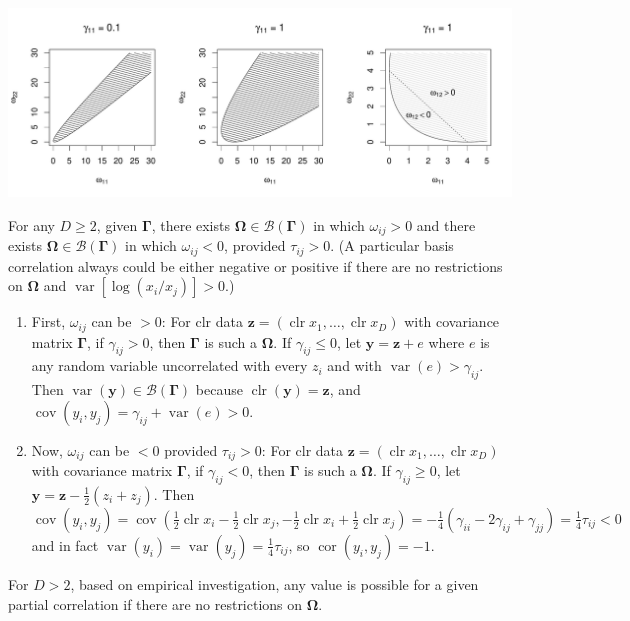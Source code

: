 \documentclass[12pt, letterpaper]{article}
\DeclareMathOperator{\cov}{\text{cov}}
\DeclareMathOperator{\cor}{\text{cor}}
\DeclareMathOperator{\var}{\text{var}}
\DeclareMathOperator{\clr}{\text{clr}}
\begin{document}
\includegraphics[width=5.5in]{figures/D2regions.pdf}

For any $D \geq 2$, given $\bm{\Gamma}$, there exists $\bm{\Omega} \in \mathscr{B}(\bm{\Gamma})$ in which $\omega_{ij} > 0$ and there exists $\bm{\Omega} \in \mathscr{B}(\bm{\Gamma})$ in which $\omega_{ij} < 0$, provided $\tau_{ij} > 0$. (A particular basis correlation always could be either negative or positive if there are no restrictions on $\bm{\Omega}$ and $\var[\log(x_i / x_j)] > 0$.)
\begin{enumerate}
\item First, $\omega_{ij}$ can be $> 0$: For clr data $\bm{z} = (\clr x_1, \dots, \clr x_D)$ with covariance matrix $\bm{\Gamma}$, if $\gamma_{ij} > 0$, then $\bm{\Gamma}$ is such a $\bm{\Omega}$. If $\gamma_{ij} \leq 0$, let $\bm{y} = \bm{z} + e$ where $e$ is any random variable uncorrelated with every $z_i$ and with $\var(e) > \gamma_{ij}$. Then $\var(\bm{y}) \in \mathscr{B}(\bm{\Gamma})$ because $\clr(\bm{y}) = \bm{z}$, and $\cov(y_i, y_j) = \gamma_{ij} + \var(e) > 0$.
\item Now, $\omega_{ij}$ can be $< 0$ provided $\tau_{ij} > 0$: For clr data $\bm{z} = (\clr x_1, \dots, \clr x_D)$ with covariance matrix $\bm{\Gamma}$, if $\gamma_{ij} < 0$, then $\bm{\Gamma}$ is such a $\bm{\Omega}$. If $\gamma_{ij} \geq 0$, let $\bm{y} = \bm{z} - \frac{1}{2}(z_i + z_j)$. Then $\cov(y_i, y_j) = \cov(\frac{1}{2}\clr x_i - \frac{1}{2}\clr x_j, -\frac{1}{2}\clr x_i + \frac{1}{2}\clr x_j) = -\frac{1}{4}(\gamma_{ii} - 2\gamma_{ij} + \gamma_{jj}) = \frac{1}{4}\tau_{ij} < 0$ and in fact $\var(y_i) = \var(y_j) = \frac{1}{4}\tau_{ij}$, so $\cor(y_i, y_j) = -1$.
\end{enumerate}

For $D > 2$, based on empirical investigation, any value is possible for a given partial correlation if there are no restrictions on $\bm{\Omega}$.
\end{document}
